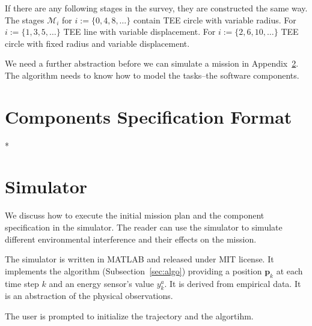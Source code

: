 \documentclass[letterpaper,10pt,conference]{ieeeconf}
\theoremstyle{definition}
\begin{document}
If there are any following stages in the survey, they are constructed the same way. The stages $\mathcal{M}_i$ for $i:=\{0,4,8,\dots\}$ contain TEE circle with variable radius. For $i:=\{1,3,5,\dots\}$ TEE line with variable displacement. For $i:=\{2,6,10,\dots\}$ TEE circle with fixed radius and variable displacement.

We need a further abstraction before we can simulate a mission in Appendix~\ref{app:simulator}. The algorithm needs to know how to model the tasks--the software components.

\section{Components Specification Format}

*

\section{Simulator}
\label{app:simulator}

We discuss how to execute the initial mission plan and the component specification in the simulator. The reader can use the simulator to simulate different environmental interference and their effects on the mission.

The simulator is written in MATLAB and released under MIT license. It implements the algorithm (Subsection~\ref{sec:algo}) providing a position $\mathbf{p}_k$ at each time step $k$ and an energy sensor's value $y_k^a$. It is derived from empirical data. It is an abstraction of the physical observations. 

The user is prompted to initialize the trajectory and the algortihm.
\end{document}
